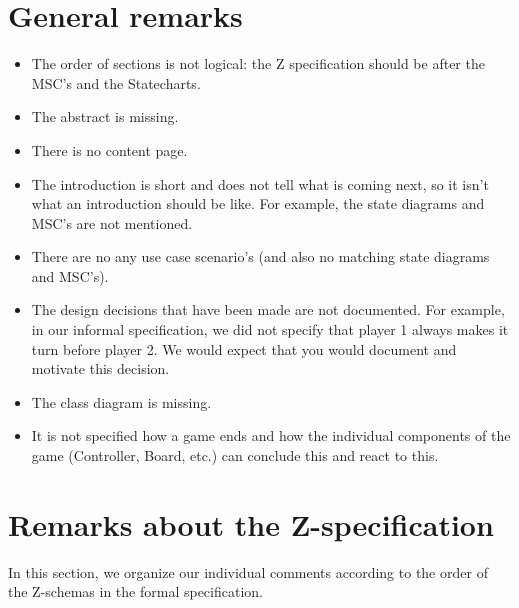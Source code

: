 \documentclass[a4paper,11pt]{article}
\begin{document}
	\section{General remarks}
    \begin{itemize}
        \item The order of sections is not logical: the Z specification should be after the MSC's and the Statecharts.
        \item The abstract is missing.
        \item There is no content page.
        \item The introduction is short and does not tell what is coming next, so it isn't what an introduction should be like. For example, the state diagrams and MSC's are not mentioned.
        \item There are no any use case scenario's (and also no matching state diagrams and MSC's).
        \item The design decisions that have been made are not documented. For example, in our informal specification, we did not specify that player 1 always makes it turn before player 2. We would expect that you would document and motivate this decision.
        \item The class diagram is missing.
        \item It is not specified how a game ends and how the individual components of the game (Controller, Board, etc.) can conclude this and react to this.
    \end{itemize}
	
	\section{Remarks about the Z-specification}
    In this section, we organize our individual comments according to the order of the Z-schemas in the formal specification.
\end{document}
